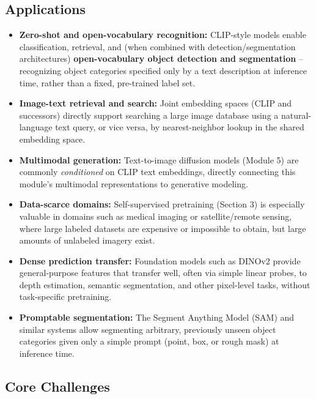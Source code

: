 \documentclass[12pt,a4paper]{article}
\begin{document}
\subsection{Applications}

\begin{itemize}[leftmargin=1.5em]
    \item \textbf{Zero-shot and open-vocabulary recognition:} CLIP-style models enable classification, retrieval, and (when combined with detection/segmentation architectures) \textbf{open-vocabulary object detection and segmentation} -- recognizing object categories specified only by a text description at inference time, rather than a fixed, pre-trained label set.
    \item \textbf{Image-text retrieval and search:} Joint embedding spaces (CLIP and successors) directly support searching a large image database using a natural-language text query, or vice versa, by nearest-neighbor lookup in the shared embedding space.
    \item \textbf{Multimodal generation:} Text-to-image diffusion models (Module 5) are commonly \emph{conditioned} on CLIP text embeddings, directly connecting this module's multimodal representations to generative modeling.
    \item \textbf{Data-scarce domains:} Self-supervised pretraining (Section 3) is especially valuable in domains such as medical imaging or satellite/remote sensing, where large labeled datasets are expensive or impossible to obtain, but large amounts of unlabeled imagery exist.
    \item \textbf{Dense prediction transfer:} Foundation models such as DINOv2 provide general-purpose features that transfer well, often via simple linear probes, to depth estimation, semantic segmentation, and other pixel-level tasks, without task-specific pretraining.
    \item \textbf{Promptable segmentation:} The Segment Anything Model (SAM) and similar systems allow segmenting arbitrary, previously unseen object categories given only a simple prompt (point, box, or rough mask) at inference time.
\end{itemize}

\subsection{Core Challenges}
\end{document}
